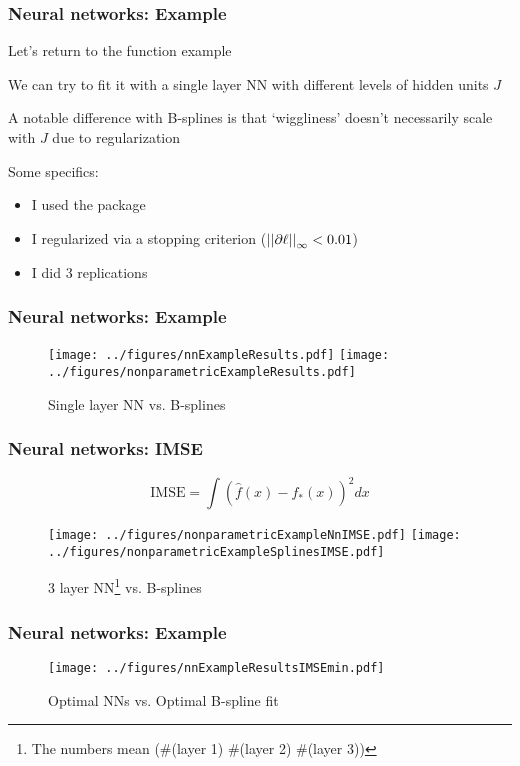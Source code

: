 \documentclass[12pt]{beamer}
\begin{document}
\begin{frame}[fragile]
\frametitle{Neural networks: Example}
Let's return to the  function example

\vsp
We can try to fit it with a single layer NN with different levels of hidden units $J$

\vsp
A notable difference with B-splines is that `wiggliness' doesn't necessarily scale with $J$ 
due to regularization

\vsp
Some specifics:
\begin{itemize}
\item I used the  package 
\item I regularized via a stopping criterion ($\left|\left| \partial \ell \right|\right|_{\infty} < 0.01$)
\item I did 3 replications
\end{itemize}
\end{frame}

\begin{frame}[fragile]
\frametitle{Neural networks: Example}
\begin{figure}
\centering
\texttt{[image: ../figures/nnExampleResults.pdf]}
\texttt{[image: ../figures/nonparametricExampleResults.pdf]}
\caption{Single layer NN vs. B-splines}
\end{figure}
\end{frame}

\begin{frame}[fragile]
\frametitle{Neural networks: IMSE}

\[
\textrm{IMSE} = \int(\hat{f}(x) - f_*(x))^2dx
\]
\begin{figure}
\centering
\texttt{[image: ../figures/nonparametricExampleNnIMSE.pdf]}
\texttt{[image: ../figures/nonparametricExampleSplinesIMSE.pdf]}
\caption{3 layer NN\footnote{The numbers mean (\#(layer 1) \#(layer 2) \#(layer 3))} vs. B-splines}
\end{figure}
\end{frame}

\begin{frame}[fragile]
\frametitle{Neural networks: Example}
\begin{figure}
\centering
\texttt{[image: ../figures/nnExampleResultsIMSEmin.pdf]}
\caption{Optimal NNs vs. Optimal B-spline fit}
\end{figure}
\end{frame}
\end{document}
